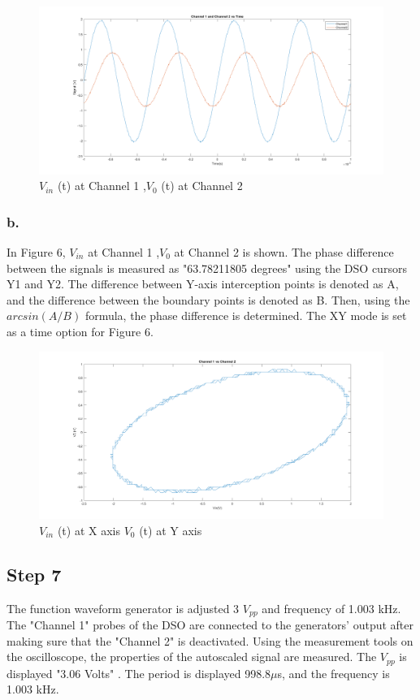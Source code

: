 \documentclass[letterpaper,12pt]{article}
\begin{document}
\begin{figure}[H]
	\caption{\( V_{in}\) (t) at Channel 1 ,\( V_0 \) (t) at Channel 2  }
	\centering
	\includegraphics[width=1\textwidth]{6a.png}
\end{figure}

\subsubsection{b.}
In Figure 6, \( V_{in}\) at Channel 1 ,\( V_0 \) at Channel 2 is shown. The phase difference between the signals is measured as "63.78211805 degrees" using the DSO cursors Y1 and Y2. The difference between Y-axis interception points is denoted as A, and the difference between the boundary points is denoted as B. Then, using the \(arcsin({A}/{B})\) formula, the phase difference is determined. The XY mode is set as a time option for Figure 6.
\begin{figure}[H]
	\caption{\( V_{in}\) (t) at X axis \( V_0 \) (t) at Y axis  }
	\centering
	\includegraphics[width=1\textwidth]{6b.png}
\end{figure}

\subsection{Step 7}
The function waveform generator is adjusted 3 \(V_{pp}\) and frequency of 1.003 kHz. The "Channel 1" probes of the DSO are connected to the generators' output after making sure that the "Channel 2" is deactivated. Using the measurement tools on the oscilloscope, the properties of the autoscaled signal are measured. The  \(V_{pp}\) is displayed "3.06 Volts" . The period is displayed 998.8\( \mu \)s, and the frequency is 1.003 kHz.
\end{document}
